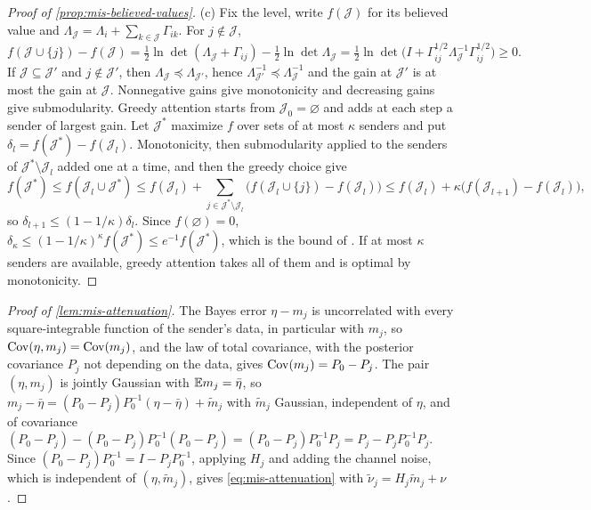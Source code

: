 \begin{proof}[Proof of \cref{prop:mis-believed-values}]
(c) Fix the level, write $f(\mathcal J)$ for its believed value and $\Lambda_{\mathcal J}=\Lambda_i+\sum_{k\in\mathcal J}\Gamma_{ik}$. For $j\notin\mathcal J$,
\begin{equation*}
f(\mathcal J\cup\{j\})-f(\mathcal J)=\tfrac12\ln\det(\Lambda_{\mathcal J}+\Gamma_{ij})-\tfrac12\ln\det\Lambda_{\mathcal J}=\tfrac12\ln\det\bigl(I+\Gamma_{ij}^{1/2}\Lambda_{\mathcal J}^{-1}\Gamma_{ij}^{1/2}\bigr)\ge0 .
\end{equation*}
If $\mathcal J\subseteq\mathcal J'$ and $j\notin\mathcal J'$, then $\Lambda_{\mathcal J}\preceq\Lambda_{\mathcal J'}$, hence $\Lambda_{\mathcal J'}^{-1}\preceq\Lambda_{\mathcal J}^{-1}$ and the gain at $\mathcal J'$ is at most the gain at $\mathcal J$. Nonnegative gains give monotonicity and decreasing gains give submodularity. Greedy attention starts from $\mathcal J_0=\varnothing$ and adds at each step a sender of largest gain. Let $\mathcal J^\ast$ maximize $f$ over sets of at most $\kappa$ senders and put $\delta_l=f(\mathcal J^\ast)-f(\mathcal J_l)$. Monotonicity, then submodularity applied to the senders of $\mathcal J^\ast\setminus\mathcal J_l$ added one at a time, and then the greedy choice give
\begin{equation*}
f(\mathcal J^\ast)\le f(\mathcal J_l\cup\mathcal J^\ast)\le f(\mathcal J_l)+\sum_{j\in\mathcal J^\ast\setminus\mathcal J_l}\bigl(f(\mathcal J_l\cup\{j\})-f(\mathcal J_l)\bigr)\le f(\mathcal J_l)+\kappa\bigl(f(\mathcal J_{l+1})-f(\mathcal J_l)\bigr),
\end{equation*}
so $\delta_{l+1}\le(1-1/\kappa)\delta_l$. Since $f(\varnothing)=0$, $\delta_\kappa\le(1-1/\kappa)^\kappa f(\mathcal J^\ast)\le e^{-1}f(\mathcal J^\ast)$, which is the bound of \citet{nemhauser1978analysis}. If at most $\kappa$ senders are available, greedy attention takes all of them and is optimal by monotonicity.
\end{proof}

\begin{proof}[Proof of \cref{lem:mis-attenuation}]
The Bayes error $\eta-m_j$ is uncorrelated with every square-integrable function of the sender's data, in particular with $m_j$, so $\operatorname{Cov}(\eta,m_j)=\operatorname{Cov}(m_j)$, and the law of total covariance, with the posterior covariance $P_j$ not depending on the data, gives $\operatorname{Cov}(m_j)=P_0-P_j$. The pair $(\eta,m_j)$ is jointly Gaussian with $\mathbb{E} m_j=\bar\eta$, so $m_j-\bar\eta=(P_0-P_j)P_0^{-1}(\eta-\bar\eta)+\tilde m_j$ with $\tilde m_j$ Gaussian, independent of $\eta$, and of covariance $(P_0-P_j)-(P_0-P_j)P_0^{-1}(P_0-P_j)=(P_0-P_j)P_0^{-1}P_j=P_j-P_jP_0^{-1}P_j$. Since $(P_0-P_j)P_0^{-1}=I-P_jP_0^{-1}$, applying $H_j$ and adding the channel noise, which is independent of $(\eta,\tilde m_j)$, gives \eqref{eq:mis-attenuation} with $\tilde\nu_j=H_j\tilde m_j+\nu$.
\end{proof}

